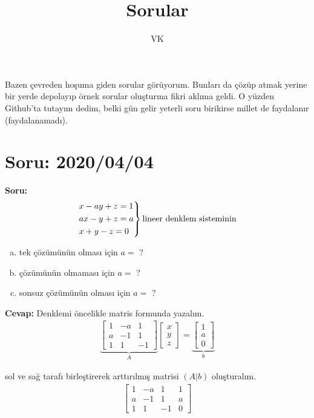 \documentclass{article}
\title{Sorular}
\author{VK}
\begin{document}
\maketitle

Bazen çevreden hoşuma giden sorular görüyorum. Bunları da çözüp atmak yerine bir yerde depolayıp örnek sorular oluşturma fikri aklıma geldi. O yüzden Github'ta tutayım dedim, belki gün gelir yeterli soru birikirse millet de faydalanır (faydalanamadı).

\section{Soru: 2020/04/04}
\textbf{Soru:}
$$
\begin{rcases}
x-ay +z = 1\\
ax - y +z =a \\
x + y -z = 0 
\end{rcases} \text{lineer denklem sisteminin}
$$

\begin{enumerate}[(a)]
	\item tek çözümünün olması için $a=$ ?
	\item çözümünün olmaması için $a=$ ?
	\item sonsuz çözümünün olması için $a=$ ?
\end{enumerate}
\textbf{Cevap: }
Denklemi öncelikle matris formunda yazalım. 
%
\begin{align}
	\underbrace{\left[\begin{matrix}
		1 & -a & 1 \\
		a & -1 & 1 \\
		1 &  1 & -1 
		\end{matrix}\right]}_{A}\left[\begin{matrix}
	x \\
	y \\
	z
	\end{matrix}\right] = \underbrace{\left[\begin{matrix}
		1 \\
		a \\
		0
		\end{matrix}\right]}_{b}
\end{align}

sol ve sağ tarafı birleştirerek arttırılmış matrisi $(A|b)$ oluşturalım. 
%
\begin{align}
\left[\begin{array}{ccc|c}
1 & -a & 1  &1 \\
a & -1 & 1  &a\\
1 &  1 & -1 &0
\end{array}\right]
\end{align}
\end{document}

